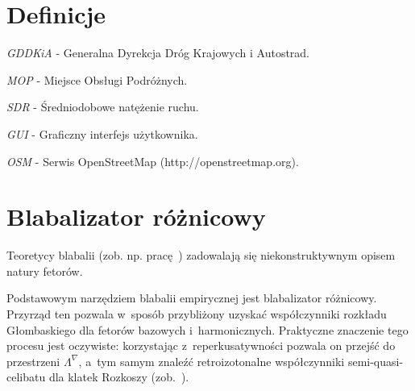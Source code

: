 \section{Definicje}

\begin{defi}\label{GDDKiA}
  \emph{GDDKiA} - Generalna Dyrekcja Dróg Krajowych i Autostrad.
\end{defi}

\begin{defi}\label{MOP}
  \emph{MOP} - Miejsce Obsługi Podróżnych.
\end{defi}

\begin{defi}\label{SDR}
  \emph{SDR} - Średniodobowe natężenie ruchu.
\end{defi}

\begin{defi}\label{GUI}
  \emph{GUI} - Graficzny interfejs użytkownika.
\end{defi}

\begin{defi}\label{OSM}
  \emph{OSM} - Serwis OpenStreetMap (http://openstreetmap.org).
\end{defi}

\section{Blabalizator różnicowy}

Teoretycy blabalii (zob. np. pracę~\cite{grglo}) zadowalają się
niekonstruktywnym opisem natury fetorów.

Podstawowym narzędziem blabalii empirycznej jest blabalizator
różnicowy.  Przyrząd ten pozwala w~sposób przybliżony uzyskać
współczynniki rozkładu Głombaskiego dla fetorów bazowych
i~harmonicznych.  Praktyczne znaczenie tego procesu jest oczywiste:
korzystając z~reperkusatywności pozwala on przejść do przestrzeni
$\Lambda^{\nabla}$, a~tym samym znaleźć retroizotonalne współczynniki
semi-quasi-celibatu dla klatek Rozkoszy (zob.~\cite{JR}).

